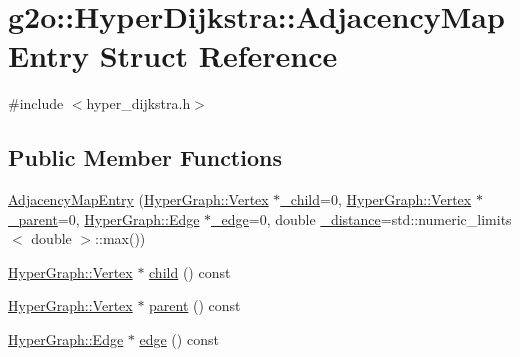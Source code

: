 \hypertarget{structg2o_1_1_hyper_dijkstra_1_1_adjacency_map_entry}{}\section{g2o\+:\+:Hyper\+Dijkstra\+:\+:Adjacency\+Map\+Entry Struct Reference}
\label{structg2o_1_1_hyper_dijkstra_1_1_adjacency_map_entry}


{\ttfamily \#include $<$hyper\+\_\+dijkstra.\+h$>$}

\subsection*{Public Member Functions}
\begin{DoxyCompactItemize}
\item 
\mbox{\hyperlink{structg2o_1_1_hyper_dijkstra_1_1_adjacency_map_entry_a160f87d80b7c2137abcce561fbc5feed}{Adjacency\+Map\+Entry}} (\mbox{\hyperlink{classg2o_1_1_hyper_graph_1_1_vertex}{Hyper\+Graph\+::\+Vertex}} $\ast$\mbox{\hyperlink{structg2o_1_1_hyper_dijkstra_1_1_adjacency_map_entry_a7ccdf917414efa537c3942d360ca127a}{\+\_\+child}}=0, \mbox{\hyperlink{classg2o_1_1_hyper_graph_1_1_vertex}{Hyper\+Graph\+::\+Vertex}} $\ast$\mbox{\hyperlink{structg2o_1_1_hyper_dijkstra_1_1_adjacency_map_entry_a3490ab9668c98d3e0cb14c54b9d41747}{\+\_\+parent}}=0, \mbox{\hyperlink{classg2o_1_1_hyper_graph_1_1_edge}{Hyper\+Graph\+::\+Edge}} $\ast$\mbox{\hyperlink{structg2o_1_1_hyper_dijkstra_1_1_adjacency_map_entry_adc56c13a328aac02456474a9e7c72415}{\+\_\+edge}}=0, double \mbox{\hyperlink{structg2o_1_1_hyper_dijkstra_1_1_adjacency_map_entry_a95b3db28f32badcdce2edf1bae83b78d}{\+\_\+distance}}=std\+::numeric\+\_\+limits$<$ double $>$\+::max())
\item 
\mbox{\hyperlink{classg2o_1_1_hyper_graph_1_1_vertex}{Hyper\+Graph\+::\+Vertex}} $\ast$ \mbox{\hyperlink{structg2o_1_1_hyper_dijkstra_1_1_adjacency_map_entry_a2db2f9eaa364a04f07c81c70784f2193}{child}} () const
\item 
\mbox{\hyperlink{classg2o_1_1_hyper_graph_1_1_vertex}{Hyper\+Graph\+::\+Vertex}} $\ast$ \mbox{\hyperlink{structg2o_1_1_hyper_dijkstra_1_1_adjacency_map_entry_a9ead453f5102583ef68f190b60249fdb}{parent}} () const
\item 
\mbox{\hyperlink{classg2o_1_1_hyper_graph_1_1_edge}{Hyper\+Graph\+::\+Edge}} $\ast$ \mbox{\hyperlink{structg2o_1_1_hyper_dijkstra_1_1_adjacency_map_entry_a4531caf2e8ceb2d86ba7dbadbc82341c}{edge}} () const

\end{DoxyCompactItemize}
